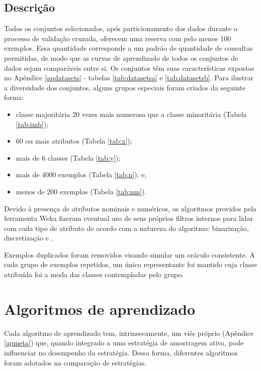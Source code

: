 \subsection{Descrição}\label{descdatasets}
Todos os conjuntos selecionados, após particionamento dos dados durante o processo de validação cruzada, oferecem uma reserva com pelo menos 100 exemplos.
Essa quantidade corresponde a um padrão de quantidade de consultas permitidas, de modo que as curvas de aprendizado de todos os conjuntos de dados sejam comparáveis entre si.
Os conjuntos têm suas características expostas no Apêndice \ref{apdatasets} - tabelas \ref{tab:datasetsa} e \ref{tab:datasetsb}.
Para ilustrar a diversidade dos conjuntos, alguns grupos especiais foram criados da seguinte forma:
\begin{itemize}
 \item classe majoritária 20 vezes mais numerosa que a classe minoritária (Tabela \ref{tab:imb});
 \item 60 ou mais atributos (Tabela \ref{tab:x});
 \item mais de 6 classes (Tabela \ref{tab:y});
 \item mais de 4000 exemplos (Tabela \ref{tab:n}); e,
 \item menos de 200 exemplos (Tabela \ref{tab:nm}). 
\end{itemize}



Devido à presença de atributos nominais e numéricos, os algoritmos providos pela ferramenta Weka \cite{journals/sigkdd/HallFHPRW09} fizeram eventual uso de seus próprios filtros internos para lidar com cada tipo de atributo de acordo com a natureza do algoritmo: binarização, discretização e  \cite{kreyszig2007advanced}.

Exemplos duplicados foram removidos visando simular um oráculo consistente.
A cada grupo de exemplos repetidos, um único representante foi mantido cuja classe atribuída foi a moda das classes contempladas pelo grupo.

\section{Algoritmos de aprendizado}\label{learners}
Cada algoritmo de aprendizado tem, intrinsecamente, um viés próprio (Apêndice \ref{apmeta}) que, quando integrado a uma estratégia de amostragem ativa, pode influenciar no desempenho da estratégia.
Dessa forma, diferentes algoritmos foram adotados na comparação de estratégias.

